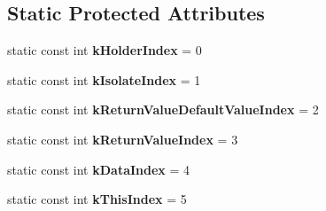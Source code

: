 \subsection*{Static Protected Attributes}
\begin{DoxyCompactItemize}
\item 
\hypertarget{classv8_1_1_property_callback_info_a8598985473483dfadba4e4c67251675b}{}static const int {\bfseries k\+Holder\+Index} = 0\label{classv8_1_1_property_callback_info_a8598985473483dfadba4e4c67251675b}

\item 
\hypertarget{classv8_1_1_property_callback_info_a59ba899cb580bc5e8adca6f799db3e2a}{}static const int {\bfseries k\+Isolate\+Index} = 1\label{classv8_1_1_property_callback_info_a59ba899cb580bc5e8adca6f799db3e2a}

\item 
\hypertarget{classv8_1_1_property_callback_info_a00849f770023891d1466176f5e0c8539}{}static const int {\bfseries k\+Return\+Value\+Default\+Value\+Index} = 2\label{classv8_1_1_property_callback_info_a00849f770023891d1466176f5e0c8539}

\item 
\hypertarget{classv8_1_1_property_callback_info_ae16cdf2c6ce787b21d94953cd514ed0e}{}static const int {\bfseries k\+Return\+Value\+Index} = 3\label{classv8_1_1_property_callback_info_ae16cdf2c6ce787b21d94953cd514ed0e}

\item 
\hypertarget{classv8_1_1_property_callback_info_a39fc5d6aaccb2916af503c7120ab99c5}{}static const int {\bfseries k\+Data\+Index} = 4\label{classv8_1_1_property_callback_info_a39fc5d6aaccb2916af503c7120ab99c5}

\item 
\hypertarget{classv8_1_1_property_callback_info_a715d28b9c57a581de1698673c9b9eb8a}{}static const int {\bfseries k\+This\+Index} = 5\label{classv8_1_1_property_callback_info_a715d28b9c57a581de1698673c9b9eb8a}

\end{DoxyCompactItemize}

